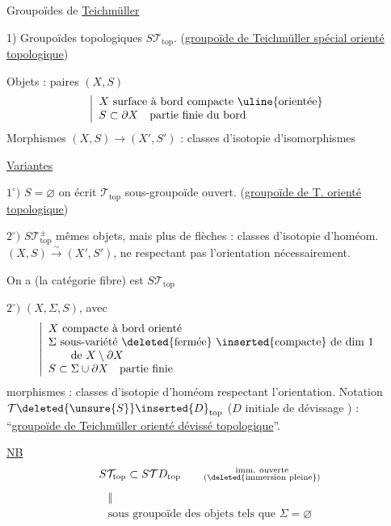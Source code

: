 Groupoïdes de \uline{Teichmüller}

1) Groupoïdes topologiques $\boxed{S\mathcal T_{\mathrm{top}}}$.
(\uline{groupoïde de Teichmüller spécial orienté topologique})

Objets : paires $(X,S)$
\[
\left|\begin{array}{l}
X\ \text{surface à bord compacte \uline{orientée}}\\
S\subset\partial X\quad\text{partie finie du bord}
\end{array}\right.
\]
Morphismes $(X,S)\longrightarrow(X',S')$ : classes d'isotopie d'isomorphismes

 \uline{Variantes}

$1^\circ)$ $S=\varnothing$ on écrit $\mathcal T_{\mathrm{top}}$ sous-groupoïde ouvert.
(\uline{groupoïde de T.  orienté topologique})

$2^\circ)$ $\boxed{S\mathcal T_{\mathrm{top}}^\pm}$ mêmes objets, mais plus de flèches :
classes d'isotopie d'homéom. $(X,S)\xrightarrow{\sim}(X',S')$, ne respectant pas l'orientation nécessairement.

On a
   (la catégorie fibre) est $S\mathcal T_{\mathrm{top}}$

$2^\circ)$ $(X,\Sigma,S)$, avec
\[
\left|\begin{array}{l}
X\ \text{compacte à bord orienté}\\
\Sigma\ \text{sous-variété \deleted{fermée} \inserted{compacte} de dim $1$}\\
\qquad\text{de }X\setminus\partial X\\
S\subset\Sigma\cup\partial X\quad\text{partie finie}
\end{array}\right.
\]
morphismes : classes d'isotopie d'homéom respectant l'orientation.
Notation $\mathcal T\deleted{\unsure{S}}\inserted{D}_{\mathrm{top}}$
($D$ initiale de dévissage ) :
``\uline{groupoïde de Teichmüller orienté dévissé topologique}''.

\uline{NB}
\[
S\mathcal T_{\mathrm{top}}\subset S\mathcal TD_{\mathrm{top}}
\qquad
\substack{\text{imm. ouverte}\\(\deleted{\text{immersion pleine}})}
\]
\[
\substack{\Vert\\\text{sous groupoïde des objets tels que }\Sigma=\varnothing}
\]

